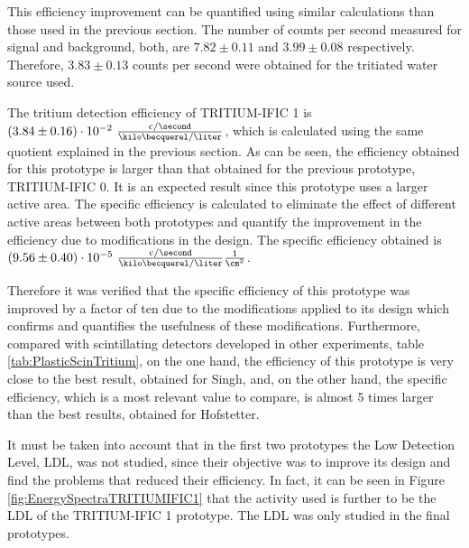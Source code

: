 This efficiency improvement can be quantified using similar calculations than those used in the previous section. The number of counts per second measured for signal and background, both, are $7.82 \pm 0.11$ and $3.99 \pm 0.08$ respectively. Therefore, $3.83 \pm 0.13$ counts per second were obtained for the tritiated water source used.

The tritium detection efficiency of TRITIUM-IFIC 1 is $(3.84 \pm 0.16)\cdot{} 10^{-2}~ \frac{\text{c}/\second}{\kilo\becquerel/\liter}$, which is calculated using the same quotient explained in the previous section. As can be seen, the efficiency obtained for this prototype is larger than that obtained for the previous prototype, TRITIUM-IFIC 0. It is an expected result since this prototype uses a larger active area. The specific efficiency is calculated to eliminate the effect of different active areas between both prototypes and quantify the improvement in the efficiency due to modifications in the design. The specific efficiency obtained is $(9.56 \pm 0.40)\cdot{} 10^{-5}~ \frac{\text{c}/\second}{\kilo\becquerel/\liter}\frac{1}{\cm^{2}}$.

Therefore it was verified that the specific efficiency of this prototype was improved by a factor of ten due to the modifications applied to its design which confirms and quantifies the usefulness of these modifications. Furthermore, compared with scintillating detectors developed in other experiments, table \ref{tab:PlasticScinTritium}, on the one hand, the efficiency of this prototype is very close to the best result, obtained for Singh, and, on the other hand, the specific efficiency, which is a most relevant value to compare, is almost 5 times larger than the best results, obtained for Hofstetter.

It must be taken into account that in the first two prototypes the Low Detection Level, LDL, was not studied, since their objective was to improve its design and find the problems that reduced their efficiency. In fact, it can be seen in Figure \ref{fig:EnergySpectraTRITIUMIFIC1} that the activity used is further to be the LDL of the TRITIUM-IFIC 1 prototype. The LDL was only studied in the final prototypes.


